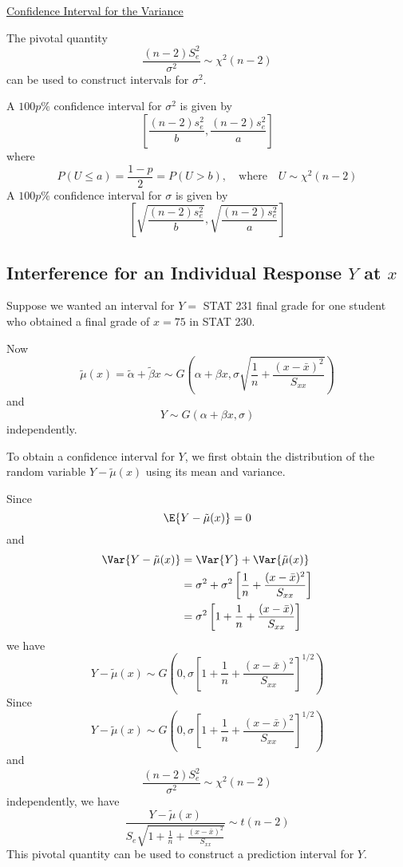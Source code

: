 \underline{Confidence Interval for the Variance}

The pivotal quantity
\[ \frac{(n-2)S_e^2}{\sigma^2}\sim \chi^2(n-2)  \]
can be used to construct intervals for $ \sigma^2 $.

A $ 100p\% $ confidence interval for $ \sigma^2 $ is given by
\[ \left[ \frac{(n-2)s_e^2}{b} , \frac{(n-2)s_e^2}{a}  \right] \]
where
\[ P(U\leqslant a)=\frac{1-p}{2}=P(U>b),\quad\text{where}\quad U\sim \chi^2(n-2) \]
A $ 100p\% $ confidence interval for $ \sigma $ is given by
\[ \left[ \sqrt{\frac{(n-2)s_e^2}{b}} , \sqrt{\frac{(n-2)s_e^2}{a}}  \right] \]

\subsection{Interference for an Individual Response $ Y $ at $ x $}
Suppose we wanted an interval for $ Y= $ STAT 231 final grade for one student
who obtained a final grade of $ x=75 $ in STAT 230.

Now
\[\tilde{\mu}(x)=\tilde{\alpha}+\tilde{\beta} x \sim G\left(\alpha+\beta x,
    \sigma \sqrt{\frac{1}{n}+\frac{(x-\bar{x})^{2}}{S_{x x}}}\right)\]
and
\[ Y \sim G(\alpha+\beta x, \sigma) \]
independently.

To obtain a confidence interval for $ Y $, we first obtain the distribution
of the random variable $ Y-\tilde{\mu}(x) $ using its mean and variance.

Since
\[ \E{Y-\tilde{\mu}(x)}=0 \]
and
\begin{align*}
    \Var{Y-\tilde{\mu}(x)}
     & =\Var{Y}+\Var{\tilde{\mu}(x)}                                                    \\
     & =\sigma^2+\sigma^2\left[ \frac{1}{n} +\frac{(x-\bar{x})^2}{S_{xx}}  \right]      \\
     & =\sigma^2\left[ 1+\frac{1}{n} + \frac{\left( x-\bar{x} \right)}{S_{xx}}  \right]
\end{align*}
we have
\[ Y-\tilde{\mu}(x)\sim G\left( 0,\sigma\left[ 1+\frac{1}{n} + \frac{\left( x-\bar{x} \right)^2}{S_{xx}}  \right]
    ^{1/2} \right) \]
Since
\[ Y-\tilde{\mu}(x)\sim G\left( 0,\sigma\left[ 1+\frac{1}{n} + \frac{\left( x-\bar{x} \right)^2}{S_{xx}}  \right]
    ^{1/2} \right) \]
and
\[ \frac{(n-2)S_e^2}{\sigma^2}\sim \chi^2(n-2)  \]
independently, we have
\[ \frac{Y-\tilde{\mu}(x)}{S_{e} \sqrt{1+\frac{1}{n}+\frac{(x-\bar{x})^{2}}{S_{x x}}}} \sim t(n-2) \]
This pivotal quantity can be used to construct a prediction interval for $ Y $.

